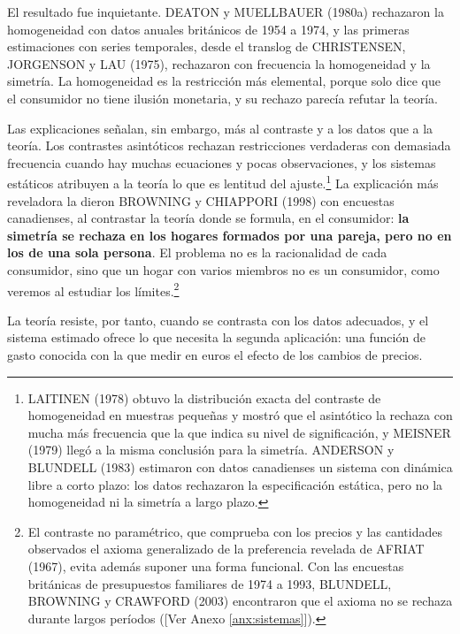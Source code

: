 \documentclass[10pt,a4paper]{article}
\newcommand{\authorfont}[1]{{\fontfamily{EBGaramond-TLF}\selectfont #1}}
\begin{document}
El resultado fue inquietante. DEATON y MUELLBAUER (1980a) rechazaron la homogeneidad con datos anuales británicos de 1954 a 1974, y las primeras estimaciones con series temporales, desde el translog de CHRISTENSEN, JORGENSON y LAU (1975), rechazaron con frecuencia la homogeneidad y la simetría. La homogeneidad es la restricción más elemental, porque solo dice que el consumidor no tiene ilusión monetaria, y su rechazo parecía refutar la teoría.

Las explicaciones señalan, sin embargo, más al contraste y a los datos que a la teoría. Los contrastes asintóticos rechazan restricciones verdaderas con demasiada frecuencia cuando hay muchas ecuaciones y pocas observaciones, y los sistemas estáticos atribuyen a la teoría lo que es lentitud del ajuste.\footnote{%
    LAITINEN (1978) obtuvo la distribución exacta del contraste de homogeneidad en muestras pequeñas y mostró que el asintótico la rechaza con mucha más frecuencia que la que indica su nivel de significación, y MEISNER (1979) llegó a la misma conclusión para la simetría. ANDERSON y BLUNDELL (1983) estimaron con datos canadienses un sistema con dinámica libre a corto plazo: los datos rechazaron la especificación estática, pero no la homogeneidad ni la simetría a largo plazo.
} La explicación más reveladora la dieron BROWNING y CHIAPPORI (1998) con encuestas canadienses, al contrastar la teoría donde se formula, en el consumidor: \textbf{la simetría se rechaza en los hogares formados por una pareja, pero no en los de una sola persona}. El problema no es la racionalidad de cada consumidor, sino que un hogar con varios miembros no es un consumidor, como veremos al estudiar los límites.\footnote{%
    El contraste no paramétrico, que comprueba con los precios y las cantidades observados el axioma generalizado de la preferencia revelada de AFRIAT (1967), evita además suponer una forma funcional. Con las encuestas británicas de presupuestos familiares de 1974 a 1993, BLUNDELL, BROWNING y CRAWFORD (2003) encontraron que el axioma no se rechaza durante largos períodos ([\authorfont{Ver Anexo \ref{anx:sistemas}}]).
}

La teoría resiste, por tanto, cuando se contrasta con los datos adecuados, y el sistema estimado ofrece lo que necesita la segunda aplicación: una función de gasto conocida con la que medir en euros el efecto de los cambios de precios.
\end{document}
